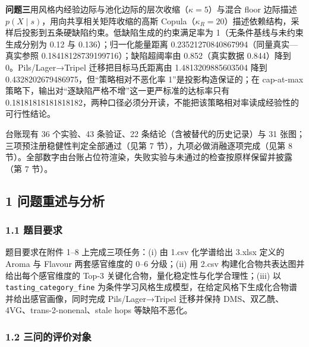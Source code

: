 \documentclass[
  11pt,
]{article}
\newcounter{none} %
\begin{document}
\textbf{问题三}用风格内经验边际与池化边际的层次收缩（\(\kappa=5\)）与混合
floor 边际描述 \(p(X\mid s)\)，用向共享相关矩阵收缩的高斯
Copula（\(\kappa_R=20\)）描述依赖结构，采样后投影到五条硬缺陷约束。低缺陷生成的约束满足率为
1（无条件基线与未约束生成分别为 0.12 与 0.136）；归一化能量距离
0.23521270840867994（同量真实---真实参照
0.18418128739199716）；缺陷超阈率由 0.852（真实数据 0.844）降到
0。Pils/Lager→Tripel 迁移把目标马氏距离由 1.4813209885603504 降到
0.4328202679486975，但``策略相对不恶化率 1''是投影构造保证的；在
cap-at-max 策略下，输出对``逐缺陷严格不增''这一更严标准的达标率只有
0.18181818181818182，两种口径必须分开读，不能把该策略相对率读成经验性的可行性结论。

台账现有 36 个实验、43 条验证、22 条结论（含被替代的历史记录）与 31
张图；三项预注册稳健性判定全部通过（见第 7
节），九项必做消融逐项完成（见第 8
节）。全部数字由台账占位符渲染，失败实验与未通过的检查按原样保留并披露（第
7 节）。

\subsection{1
问题重述与分析}\label{ux95eeux9898ux91cdux8ff0ux4e0eux5206ux6790}

\subsubsection{1.1 题目要求}\label{ux9898ux76eeux8981ux6c42}

题目要求在附件 1--8 上完成三项任务：(i) 由 1.csv 化学谱给出 3.xlsx
定义的 Aroma 与 Flavour 两套感官维度的 0--6 分级；(ii) 用 2.csv
构建化合物共表达图并给出每个感官维度的 Top-3
关键化合物，量化稳定性与化学合理性；(iii) 以
\texttt{tasting\_category\_fine}
为条件学习风格生成模型，在给定风格下生成化合物谱并给出感官画像，同时完成
Pils/Lager→Tripel 迁移并保持 DMS、双乙酰、4VG、trans-2-nonenal、stale
hops 等缺陷不恶化。

\subsubsection{1.2
三问的评价对象}\label{ux4e09ux95eeux7684ux8bc4ux4ef7ux5bf9ux8c61}
\end{document}
